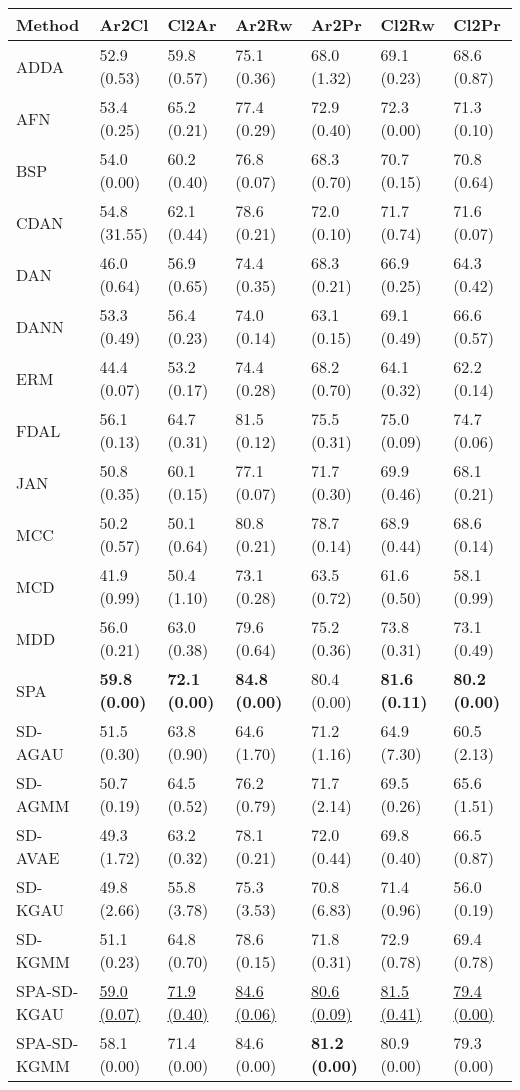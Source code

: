 \begin{tabular}{lllllll}
\toprule
Method & Ar2Cl & Cl2Ar & Ar2Rw & Ar2Pr & Cl2Rw & Cl2Pr \\
\midrule
ADDA & 52.9 (0.53) & 59.8 (0.57) & 75.1 (0.36) & 68.0 (1.32) & 69.1 (0.23) & 68.6 (0.87) \\
AFN & 53.4 (0.25) & 65.2 (0.21) & 77.4 (0.29) & 72.9 (0.40) & 72.3 (0.00) & 71.3 (0.10) \\
BSP & 54.0 (0.00) & 60.2 (0.40) & 76.8 (0.07) & 68.3 (0.70) & 70.7 (0.15) & 70.8 (0.64) \\
CDAN & 54.8 (31.55) & 62.1 (0.44) & 78.6 (0.21) & 72.0 (0.10) & 71.7 (0.74) & 71.6 (0.07) \\
DAN & 46.0 (0.64) & 56.9 (0.65) & 74.4 (0.35) & 68.3 (0.21) & 66.9 (0.25) & 64.3 (0.42) \\
DANN & 53.3 (0.49) & 56.4 (0.23) & 74.0 (0.14) & 63.1 (0.15) & 69.1 (0.49) & 66.6 (0.57) \\
ERM & 44.4 (0.07) & 53.2 (0.17) & 74.4 (0.28) & 68.2 (0.70) & 64.1 (0.32) & 62.2 (0.14) \\
FDAL & 56.1 (0.13) & 64.7 (0.31) & 81.5 (0.12) & 75.5 (0.31) & 75.0 (0.09) & 74.7 (0.06) \\
JAN & 50.8 (0.35) & 60.1 (0.15) & 77.1 (0.07) & 71.7 (0.30) & 69.9 (0.46) & 68.1 (0.21) \\
MCC & 50.2 (0.57) & 50.1 (0.64) & 80.8 (0.21) & 78.7 (0.14) & 68.9 (0.44) & 68.6 (0.14) \\
MCD & 41.9 (0.99) & 50.4 (1.10) & 73.1 (0.28) & 63.5 (0.72) & 61.6 (0.50) & 58.1 (0.99) \\
MDD & 56.0 (0.21) & 63.0 (0.38) & 79.6 (0.64) & 75.2 (0.36) & 73.8 (0.31) & 73.1 (0.49) \\
SPA & \textbf{59.8 (0.00)} & \textbf{72.1 (0.00)} & \textbf{84.8 (0.00)} & 80.4 (0.00) & \textbf{81.6 (0.11)} & \textbf{80.2 (0.00)} \\
\midrule
SD-AGAU & 51.5 (0.30) & 63.8 (0.90) & 64.6 (1.70) & 71.2 (1.16) & 64.9 (7.30) & 60.5 (2.13) \\
SD-AGMM & 50.7 (0.19) & 64.5 (0.52) & 76.2 (0.79) & 71.7 (2.14) & 69.5 (0.26) & 65.6 (1.51) \\
SD-AVAE & 49.3 (1.72) & 63.2 (0.32) & 78.1 (0.21) & 72.0 (0.44) & 69.8 (0.40) & 66.5 (0.87) \\
SD-KGAU & 49.8 (2.66) & 55.8 (3.78) & 75.3 (3.53) & 70.8 (6.83) & 71.4 (0.96) & 56.0 (0.19) \\
SD-KGMM & 51.1 (0.23) & 64.8 (0.70) & 78.6 (0.15) & 71.8 (0.31) & 72.9 (0.78) & 69.4 (0.78) \\
SPA-SD-KGAU & \underline{59.0 (0.07)} & \underline{71.9 (0.40)} & \underline{84.6 (0.06)} & \underline{80.6 (0.09)} & \underline{81.5 (0.41)} & \underline{79.4 (0.00)} \\
SPA-SD-KGMM & 58.1 (0.00) & 71.4 (0.00) & 84.6 (0.00) & \textbf{81.2 (0.00)} & 80.9 (0.00) & 79.3 (0.00) \\
\bottomrule
\end{tabular}
